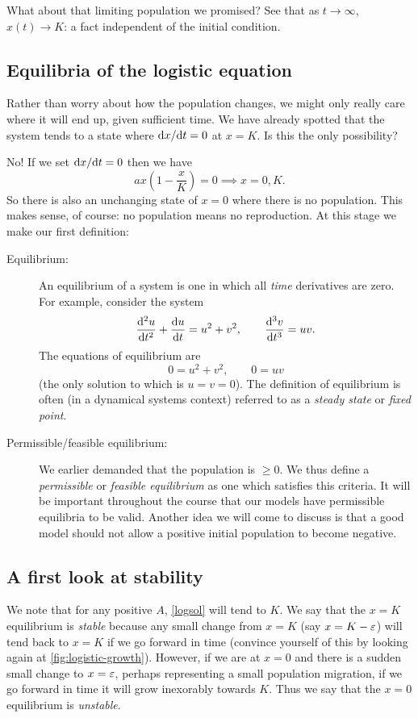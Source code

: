 \documentclass[main.tex]{subfiles}
\begin{document}
What about that limiting population we promised? See that as $t \to \infty$, $x(t) \to K$: a fact independent of the initial condition.


\subsection{Equilibria of the logistic equation}
Rather than worry about how the population changes, we might only really care where it will end up, given sufficient time. We have already spotted that the system tends to a state where $\fd{x}{t}=0$ at $x=K$. Is this the only possibility? 

No! If we set $\fd{x}{t}=0$ then we have
\begin{equation}
	a x\left(1-\frac{x}{K}\right) = 0 \implies x=0, K.
\end{equation}
So there is also an unchanging state of $x=0$ where there is no population. This makes sense, of course: no population means no reproduction.  At this stage we make our first definition:

\begin{description}
\item[Equilibrium:] An equilibrium of a system is one in which all \emph{time} derivatives are zero. For example, consider the system
\begin{equation}
\fdd{u}{t}  + \fd{u}{t} = u^2+v^2,\qquad \fdn{3}{v}{t} = uv.
\end{equation}
The equations of equilibrium are
\begin{equation}
 0 = u^2+v^2,\qquad  0 = uv
\end{equation}
(the only solution to which is $u=v=0$). The definition of equilibrium is often (in a dynamical systems context) referred to as a \emph{steady state} or \emph{fixed point}.

\item[Permissible/feasible equilibrium:]
We earlier demanded that the population is $\geq 0$. We thus define a \emph{permissible} or \emph{feasible equilibrium} as one which satisfies this criteria. It will be important throughout the course that our models have permissible equilibria to be valid. Another idea we will come to discuss is that a good model should not allow a positive initial population to become negative.
\end{description}

\subsection{A first look at stability}
We note that for any positive $A$, \cref{logsol} will tend to $K$. We say that the $x=K$ equilibrium is \emph{stable} because any small change from $x=K$ (say $x= K-\varepsilon$) will tend back to $x=K$ if we go forward in time (convince yourself of this by looking again at \cref{fig:logistic-growth}). However, if we are at $x=0$ and there is a sudden small change to  $x=\varepsilon$, perhaps representing a small population migration, if we go forward in time it will grow inexorably towards $K$. Thus we say that the $x=0$ equilibrium is \emph{unstable}. 
\end{document}
